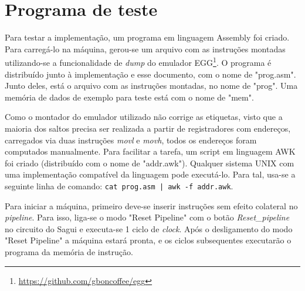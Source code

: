 \documentclass{article}
\begin{document}
\section{Programa de teste}

Para testar a implementação, um programa em linguagem Assembly foi criado. Para
carregá-lo na máquina, gerou-se um arquivo com as instruções montadas
utilizando-se a funcionalidade de \textit{dump} do emulador
EGG\footnote{\url{https://github.com/gboncoffee/egg}}. O programa é distribuído
junto à implementação e esse documento, com o nome de "prog.asm". Junto deles,
está o arquivo com as instruções montadas, no nome de "prog". Uma memória de
dados de exemplo para teste está com o nome de "mem".

Como o montador do emulador utilizado não corrige as etiquetas, visto que a
maioria dos saltos precisa ser realizada a partir de registradores com
endereços, carregados via duas instruções \textit{movl} e \textit{movh}, todos
os endereços foram computados manualmente. Para facilitar a tarefa, um script em
linguagem AWK foi criado (distribuído com o nome de "addr.awk"). Qualquer
sistema UNIX com uma implementação compatível da linguagem pode executá-lo. Para
tal, usa-se a seguinte linha de comando: \verb=cat prog.asm | awk -f addr.awk=.

Para iniciar a máquina, primeiro deve-se inserir instruções sem efeito colateral
no \textit{pipeline}. Para isso, liga-se o modo "Reset Pipeline" com o botão
\textit{Reset\_pipeline} no circuito do Sagui e executa-se 1 ciclo de
\textit{clock}. Após o desligamento do modo "Reset Pipeline" a máquina estará
pronta, e os ciclos subsequentes executarão o programa da memória de instrução.
\end{document}
